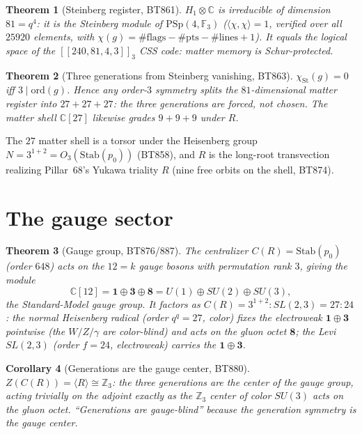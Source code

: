 \documentclass[11pt]{article}
\newtheorem{theorem}{Theorem}
\newtheorem{corollary}[theorem]{Corollary}
\newcommand{\GF}[1]{\mathbb{F}_{#1}}
\newcommand{\PSp}{\mathrm{PSp}}
\newcommand{\Z}{\mathbb{Z}}
\newcommand{\CC}{\mathbb{C}}
\begin{document}
\begin{theorem}[Steinberg register, BT861]
$H_1\otimes\CC$ is irreducible of dimension $81=q^4$: it is the
\emph{Steinberg module} of $\PSp(4,\GF3)$
($\langle\chi,\chi\rangle=1$, verified over all $25920$ elements, with
$\chi(g)=\#\mathrm{flags}-\#\mathrm{pts}-\#\mathrm{lines}+1$). It equals
the logical space of the $[[240,81,4,3]]_3$ CSS code: matter memory is
Schur-protected.
\end{theorem}

\begin{theorem}[Three generations from Steinberg vanishing, BT863]
$\chi_{\mathrm{St}}(g)=0$ iff $3\mid\mathrm{ord}(g)$. Hence \emph{any}
order-$3$ symmetry splits the $81$-dimensional matter register into
$27+27+27$: the three generations are forced, not chosen. The matter
shell $\CC[27]$ likewise grades $9+9+9$ under $R$.
\end{theorem}

The $27$ matter shell is a torsor under the Heisenberg group
$N=3^{1+2}=O_3(\mathrm{Stab}(p_0))$ (BT858), and $R$ is the long-root
transvection realizing Pillar~68's Yukawa triality $R$ (nine free orbits
on the shell, BT874).

\section{The gauge sector}
\begin{theorem}[Gauge group, BT876/887]
The centralizer $C(R)=\mathrm{Stab}(p_0)$ (order $648$) acts on the
$12=k$ gauge bosons with permutation rank $3$, giving the module
\[
\CC[12]=\mathbf 1\oplus\mathbf 3\oplus\mathbf 8
=U(1)\oplus SU(2)\oplus SU(3),
\]
the Standard-Model gauge group. It factors as $C(R)=3^{1+2}:SL(2,3)
=27{:}24$: the normal Heisenberg radical (order $q^q=27$, \emph{color})
fixes the electroweak $\mathbf 1\oplus\mathbf 3$ pointwise (the
$W/Z/\gamma$ are color-blind) and acts on the gluon octet $\mathbf 8$;
the Levi $SL(2,3)$ (order $f=24$, \emph{electroweak}) carries the
$\mathbf 1\oplus\mathbf 3$.
\end{theorem}

\begin{corollary}[Generations are the gauge center, BT880]
$Z(C(R))=\langle R\rangle\cong\Z_3$: the three generations are the
center of the gauge group, acting trivially on the adjoint exactly as
the $\Z_3$ center of color $SU(3)$ acts on the gluon octet. ``Generations
are gauge-blind'' because the generation symmetry \emph{is} the gauge
center.
\end{corollary}
\end{document}
